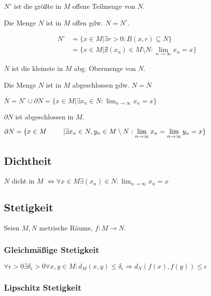 $N^\circ$ ist die größte in $M$ offene Teilmenge von $N$.

Die Menge $N$ ist in $M$ offen gdw. $N = N^\circ$.

\vspace*{-6mm}
\begin{align*}
	N^\circ &= \{x \in M | \exists r > 0 : B(x, r) \subseteq N\} \\
	        &= \{x \in M | \nexists (x_n) \in M \setminus N : \displaystyle\lim_{n \to \infty} x_n = x\}
\end{align*}
\vspace*{-6mm}

$\overline N$ ist die kleinste in $M$ abg. Obermenge von $N$.

Die Menge $N$ ist in $M$ abgeschlossen gdw. $N = \overline N$

$\overline N = N^\circ \cup \partial N = \{x \in M | \exists x_n \in N : \lim_{n \to \infty} x_n = x \}$

$\partial N$ ist abgeschlossen in $M$.

$\partial N = \{ x \in M \\ \hspace*{8.5mm} | \exists x_n \in N, y_n \in M \setminus N : \displaystyle\lim_{n \to \infty} x_n = \displaystyle\lim_{n \to \infty} y_n = x \}$

\subsection*{Dichtheit}

$N$ dicht in $M$ $\Leftrightarrow \forall x \in M \exists (x_n) \in N : \displaystyle\lim_{n \to \infty} x_n = x$

\subsection*{Stetigkeit}

Seien $M, N$ metrische Räume, $f : M \rightarrow N$.

\subsubsection*{Gleichmäßige Stetigkeit}

$\forall \epsilon > 0 \exists \delta_\epsilon > 0 \forall x, y \in M : d_M(x, y) \leq \delta_\epsilon \Rightarrow d_N(f(x), f(y)) \leq \epsilon$

\subsubsection*{Lipschitz Stetigkeit}

